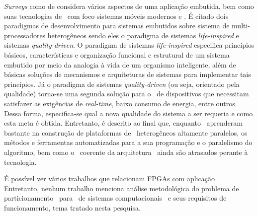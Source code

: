    \textit{Surveys} como de \cite{Jozwiak2017} considera vários aspectos de uma aplicação embutida, bem como suas tecnologias de \design\ com foco sistemas móveis modernos e \wearables.
   É citado dois paradigmas de desenvolvimento para sistemas embutidos sobre sistema de multi-processadores heterogêneos sendo eles o paradigma de sistemas \textit{life-inspired} e sistemas \textit{quality-driven}.
   O paradigma de sistemas \textit{life-inspired} especifica princípios básicos, características e organização funcional e estrutural de um sistema embutido por meio da analogia à vida de um organismo inteligente, além de básicas soluções de mecanismos e arquiteturas de sistemas para implementar tais princípios.
   Já o paradigma de sistemas \textit{quality-driven} (ou seja, orientado pela qualidade) torna-se uma segunda solução para o \design\ de dispositivos que necessitam satisfazer as exigências de \textit{real-time}, baixo consumo de energia, entre outros.
   Dessa forma, especifica-se qual a nova qualidade do sistema a ser requeria e como esta meta é obtida.
   Entretanto, é descrito ao final que, enquanto \designers\ aprenderam bastante na construção de plataformas de \hardware\ heterogêneos altamente paralelos, os métodos e ferramentas automatizadas para a sua programação e o paralelismo do algoritmo, bem como o \codesign\ coerente da arquitetura \hs\ ainda são atrasados perante à tecnologia.

   É possível ver vários trabalhos \cite{Plessl2003, Ahola2007, Abdelhedi2016, Narumi2016, Lee2015} que relacionam FPGAs com aplicação \wearable.
   Entretanto, nenhum trabalho menciona análise metodológica do problema de particionamento \hs\ para \design\ de sistemas computacionais \wearables\ e seus requisitos de funcionamento, tema tratado nesta pesquisa.
